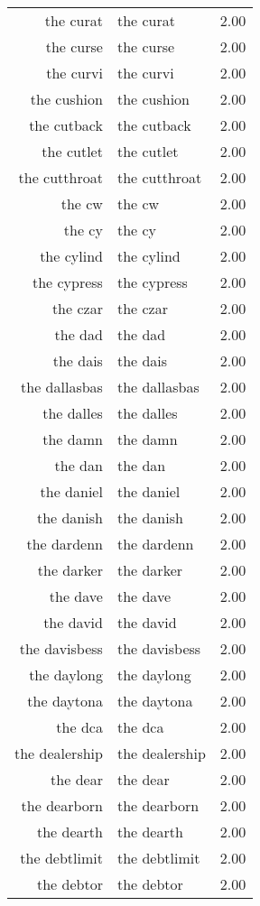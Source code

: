 \begin{table}[ht]
\begin{tabular}{rlr}
  the curat & the curat & 2.00 \\ 
  the curse & the curse & 2.00 \\ 
  the curvi & the curvi & 2.00 \\ 
  the cushion & the cushion & 2.00 \\ 
  the cutback & the cutback & 2.00 \\ 
  the cutlet & the cutlet & 2.00 \\ 
  the cutthroat & the cutthroat & 2.00 \\ 
  the cw & the cw & 2.00 \\ 
  the cy & the cy & 2.00 \\ 
  the cylind & the cylind & 2.00 \\ 
  the cypress & the cypress & 2.00 \\ 
  the czar & the czar & 2.00 \\ 
  the dad & the dad & 2.00 \\ 
  the dais & the dais & 2.00 \\ 
  the dallasbas & the dallasbas & 2.00 \\ 
  the dalles & the dalles & 2.00 \\ 
  the damn & the damn & 2.00 \\ 
  the dan & the dan & 2.00 \\ 
  the daniel & the daniel & 2.00 \\ 
  the danish & the danish & 2.00 \\ 
  the dardenn & the dardenn & 2.00 \\ 
  the darker & the darker & 2.00 \\ 
  the dave & the dave & 2.00 \\ 
  the david & the david & 2.00 \\ 
  the davisbess & the davisbess & 2.00 \\ 
  the daylong & the daylong & 2.00 \\ 
  the daytona & the daytona & 2.00 \\ 
  the dca & the dca & 2.00 \\ 
  the dealership & the dealership & 2.00 \\ 
  the dear & the dear & 2.00 \\ 
  the dearborn & the dearborn & 2.00 \\ 
  the dearth & the dearth & 2.00 \\ 
  the debtlimit & the debtlimit & 2.00 \\ 
  the debtor & the debtor & 2.00 \\ 

\end{tabular}
\end{table}
